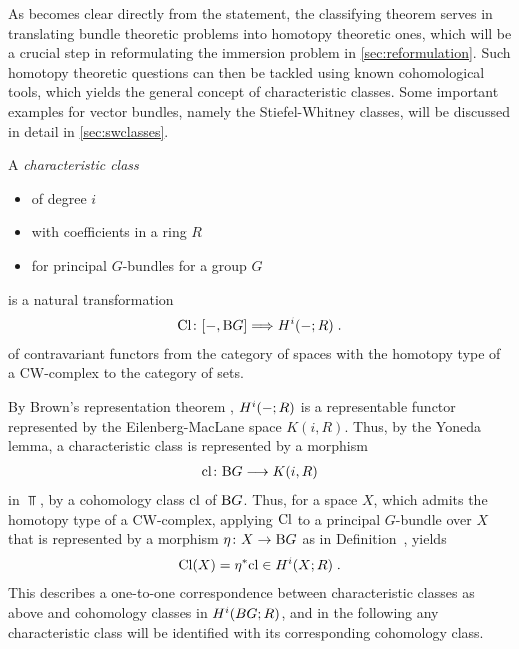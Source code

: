 As becomes clear directly from the statement, the classifying
theorem serves in translating bundle theoretic problems into homotopy
theoretic ones, which will be a crucial step in reformulating the
immersion problem in \autoref{sec:reformulation}.
Such homotopy theoretic questions can then be tackled using known
cohomological tools, which yields the general concept of
characteristic classes.
Some important examples for vector bundles, namely the
Stiefel-Whitney classes, will be discussed in detail in
\autoref{sec:swclasses}.
\begin{Def}
  A \emph{characteristic class}
  \begin{itemize}
  \item of degree $i$
  \item with coefficients in a ring $R$
  \item for principal $G$-bundles for a group $G$
  \end{itemize}
  is a natural transformation
  \begin{gather*}
    \mathrm{Cl}\colon [-, \mathrm{B}G] \Longrightarrow H^i(-; R)\;.
  \end{gather*}
  of contravariant functors from the category of spaces with the
  homotopy type of a CW-complex to the category of sets.
\end{Def}
\begin{Rem}
  By Brown's representation theorem ,
  $H^i(-;R)$ is a representable functor represented by the
  Eilenberg-MacLane space $K(i,R)$.
  Thus, by the Yoneda lemma, a characteristic class is
  represented by a morphism
  \begin{gather*}
    \mathrm{cl}\colon \mathrm{B}G \longrightarrow K(i, R)
  \end{gather*}
  in $\Top$, \idest by a cohomology class $\mathrm{cl}$ of $\mathrm{B}G$.
  Thus, for a space $X$, which admits the homotopy type of a
  CW-complex, 
  applying $\mathrm{Cl}$ to a principal $G$-bundle over $X$ that is
  represented by a morphism $\eta\colon X\to\mathrm{B}G$
  as in Definition~,
  yields
  \begin{gather*}
    \mathrm{Cl}(X) = {\eta}^* \mathrm{cl} \in H^i(X;R)
    \;.
  \end{gather*}
  This describes a one-to-one correspondence between
  characteristic classes as above and cohomology classes in
  $H^i(BG;R)$, and in the following any characteristic class will be
  identified with its corresponding cohomology class.
\end{Rem}

